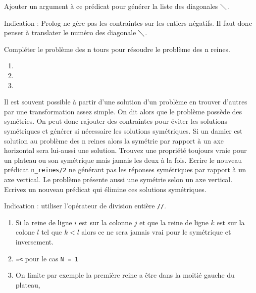 \documentclass[a4paper]{article}
\newenvironment{CAnswer}{\color{red}\begin{Answer}}
                        {\end{Answer}}
\begin{document}
\begin{Exercise}[title={Numérotation des diagonales}]
\Question
Ajouter un argument à ce prédicat pour générer la liste des diagonales
$\diagdown$.

Indication : Prolog ne gère pas les contraintes sur les entiers négatifs. Il
faut donc penser à translater le numéro des diagonale $\diagdown$.

\Question
Compléter le problème des n tours pour résoudre le problème des n reines.
\end{Exercise}
\begin{CAnswer}
\begin{enumerate}
 \item 
 \item 
 \item 
\end{enumerate}

\end{CAnswer}

\begin{Exercise}[title={Elimination des symétries}]
Il est souvent possible à partir d'une solution d'un problème en trouver
d'autres par une transformation assez simple. On dit alors que le problème
possède des symétries. On peut donc rajouter des contraintes pour éviter les
solutions symétriques et générer si nécessaire les solutions symétriques.
\Question Si un damier est solution au problème des n reines alors la symétrie
par rapport à un axe horizontal sera lui-aussi une solution. Trouvez une
propriété toujours vraie pour un plateau ou son symétrique mais jamais les 
deux à la fois.
\Question Ecrire le nouveau prédicat \verb$n_reines/2$ ne générant pas les
réponses symétriques par rapport à un axe vertical.
\Question Le problème présente aussi une symétrie selon un axe vertical.
Ecrivez un nouveau prédicat qui élimine ces solutions symétriques.

Indication : utiliser l'opérateur de division entière \verb$//$.
\end{Exercise}
\begin{CAnswer}
\begin{enumerate}
 \item Si la reine de ligne $i$ est sur la colonne $j$ et que la reine de 
       ligne $k$ est sur la colone $l$ tel que $k < l$ alors ce ne sera jamais
       vrai pour le symétrique et inversement.
 \item 
       \verb$=<$ pour le cas \verb$N = 1$
 \item On limite par exemple la première reine a être dans la moitié gauche du
       plateau,
       
\end{enumerate}
\end{CAnswer}
\end{document}
